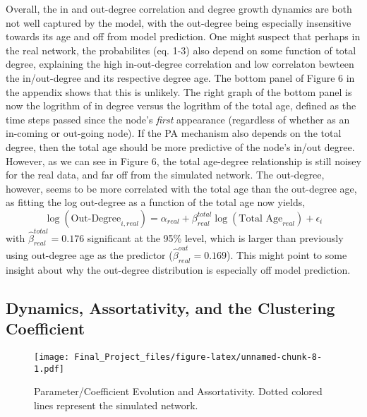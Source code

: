 \documentclass[]{elsarticle} %
\makeatletter
\def\maxwidth{\ifdim\Gin@nat@width>\linewidth\linewidth
\else\Gin@nat@width\fi}
\let\Oldincludegraphics\includegraphics
\renewcommand{\includegraphics}[1]{\Oldincludegraphics[width=\maxwidth]{#1}}
\makeatother
\begin{document}
Overall, the in and out-degree correlation and degree growth dynamics
are both not well captured by the model, with the out-degree being
especially insensitive towards its age and off from model prediction.
One might suspect that perhaps in the real network, the probabilites
(eq. 1-3) also depend on some function of total degree, explaining the
high in-out-degree correlation and low correlaton bewteen the
in/out-degree and its respective degree age. The bottom panel of Figure
6 in the appendix shows that this is unlikely. The right graph of the
bottom panel is now the logrithm of in degree versus the logrithm of the
total age, defined as the time steps passed since the node's
\emph{first} appearance (regardless of whether as an in-coming or
out-going node). If the PA mechanism also depends on the total degree,
then the total age should be more predictive of the node's in/out
degree. However, as we can see in Figure 6, the total age-degree
relationship is still noisey for the real data, and far off from the
simulated network. The out-degree, however, seems to be more correlated
with the total age than the out-degree age, as fitting the log
out-degree as a function of the total age now yields, \[
\log(\text{Out-Degree}_{i, real}) = \alpha_{real} + \beta^{total}_{real} \log(\text{Total Age}_{real}) + \epsilon_{i}
\] with \(\hat{\beta}^{total}_{real} = 0.176\) significant at the 95\%
level, which is larger than previously using out-degree age as the
predictor (\(\hat{\beta}^{out}_{real} = 0.169\)). This might point to
some insight about why the out-degree distribution is especially off
model prediction.

\subsection{Dynamics, Assortativity, and the Clustering
Coefficient}\label{dynamics-assortativity-and-the-clustering-coefficient}

\begin{figure}[htbp]
\centering
\texttt{[image: Final\_Project\_files/figure-latex/unnamed-chunk-8-1.pdf]}
\caption{Parameter/Coefficient Evolution and Assortativity. Dotted
colored lines represent the simulated network.}
\end{figure}
\end{document}
